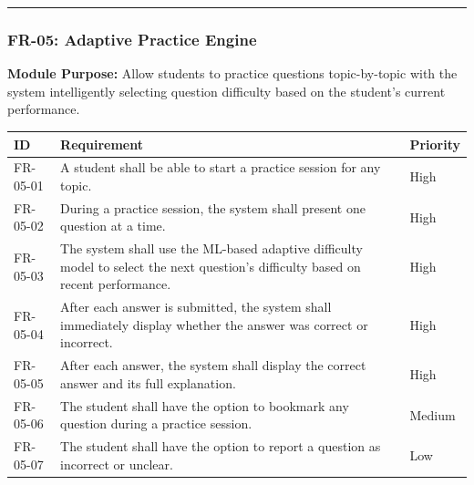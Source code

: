 \documentclass[
]{article}
\begin{document}
\begin{center}\rule{0.5\linewidth}{0.5pt}\end{center}

\subsubsection{FR-05: Adaptive Practice
Engine}\label{fr-05-adaptive-practice-engine}

\textbf{Module Purpose:} Allow students to practice questions
topic-by-topic with the system intelligently selecting question
difficulty based on the student's current performance.

\begin{longtable}[]{@{}
  >{\raggedright\arraybackslash}p{}
  >{\raggedright\arraybackslash}p{}
  >{\raggedright\arraybackslash}p{}@{}}
\toprule\noalign{}
\begin{minipage}[b]{\linewidth}\raggedright
ID
\end{minipage} & \begin{minipage}[b]{\linewidth}\raggedright
Requirement
\end{minipage} & \begin{minipage}[b]{\linewidth}\raggedright
Priority
\end{minipage} \\
\midrule\noalign{}
\endhead
\bottomrule\noalign{}
\endlastfoot
FR-05-01 & A student shall be able to start a practice session for any
topic. & High \\
FR-05-02 & During a practice session, the system shall present one
question at a time. & High \\
FR-05-03 & The system shall use the ML-based adaptive difficulty model
to select the next question's difficulty based on recent performance. &
High \\
FR-05-04 & After each answer is submitted, the system shall immediately
display whether the answer was correct or incorrect. & High \\
FR-05-05 & After each answer, the system shall display the correct
answer and its full explanation. & High \\
FR-05-06 & The student shall have the option to bookmark any question
during a practice session. & Medium \\
FR-05-07 & The student shall have the option to report a question as
incorrect or unclear. & Low \\

\end{longtable}
\end{document}
